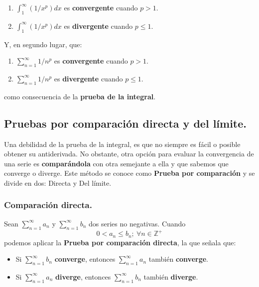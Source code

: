 \documentclass[12pt]{article}
\begin{document}
\begin{enumerate}
\item $\int_{1}^{\infty} (1/x^{p})dx$ es \textbf{convergente} cuando $p > 1$.
\item $\int_{1}^{\infty} (1/x^{p})dx$ es \textbf{divergente} cuando $p \leq 1$.
\end{enumerate}

Y, en segundo lugar, que:

\begin{enumerate}
\item $\sum_{n = 1}^{\infty} 1/n^{p}$ es \textbf{convergente} cuando $p > 1$.
\item $\sum_{n = 1}^{\infty} 1/n^{p}$ es \textbf{divergente} cuando $p \leq 1$.
\end{enumerate}

como consecuencia de la \textbf{prueba de la integral}.

\subsection{Pruebas por comparación directa y del límite.}

Una debilidad de la prueba de la integral, es que no siempre es fácil o posible obtener su antiderivada. No obstante, otra opción para evaluar la convergencia de una serie es \textbf{comparándola} con otra semejante a ella y que sabemos que converge o diverge. Este método se conoce como \textbf{Prueba por comparación} y se divide en dos: Directa y Del límite.

\subsubsection{Comparación directa.}

Sean $\sum_{n = 1}^{\infty} a_{n}$ y $\sum_{n = 1}^{\infty} b_{n}$ dos series no negativas. Cuando
\[
  0 < a_{n} \leq b_{n}; \ \forall n \in \mathbb{Z}^{+}
\]
podemos aplicar la \textbf{Prueba por comparación directa}, la que señala que:

\begin{itemize}
\item Si $\sum_{n = 1}^{\infty} b_{n}$ \textbf{converge}, entonces $\sum_{n = 1}^{\infty} a_{n}$ también \textbf{converge}.
\item Si $\sum_{n = 1}^{\infty} a_{n}$ \textbf{diverge}, entonces $\sum_{n = 1}^{\infty} b_{n}$ también \textbf{diverge}.
\end{itemize}
\end{document}
